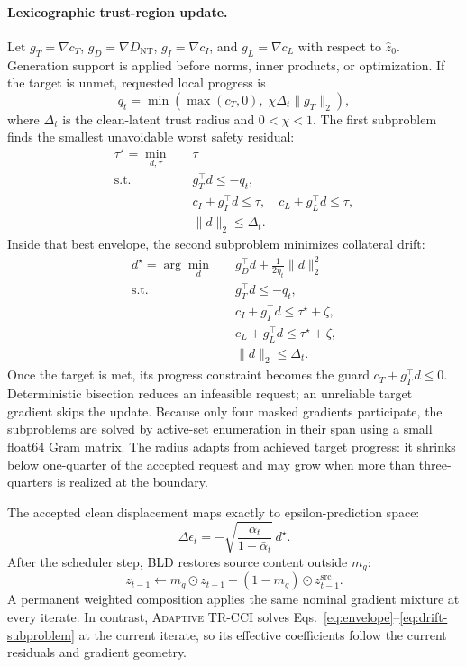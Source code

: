 \documentclass[10pt,twocolumn]{article}
\newcommand{\method}{\textsc{Adaptive TR-CCI}}
\newcommand{\bld}{\textsc{BLD}}
\begin{document}
\paragraph{Lexicographic trust-region update.}
Let $g_T=\nabla c_T$, $g_D=\nabla D_{\mathrm{NT}}$,
$g_I=\nabla c_I$, and $g_L=\nabla c_L$ with respect to $\hat z_0$. Generation
support is applied before norms, inner products, or optimization. If the target
is unmet, requested local progress is
\begin{equation}
 q_t=\min\!\left(\max(c_T,0),\;\chi\Delta_t\lVert g_T\rVert_2\right),
 \label{eq:requested-progress}
\end{equation}
where $\Delta_t$ is the clean-latent trust radius and $0<\chi<1$. The first
subproblem finds the smallest unavoidable worst safety residual:
\begin{align}
 \tau^\star=\min_{d,\tau}\quad&\tau\\
 \text{s.t.}\quad
 &g_T^\top d\leq-q_t,\nonumber\\
 &c_I+g_I^\top d\leq\tau,\quad
  c_L+g_L^\top d\leq\tau,\nonumber\\
 &\lVert d\rVert_2\leq\Delta_t.
 \label{eq:envelope}
\end{align}
Inside that best envelope, the second subproblem minimizes collateral drift:
\begin{align}
 d^\star=\arg\min_d\quad
 &g_D^\top d+\frac{1}{2\eta_t}\lVert d\rVert_2^2\\
 \text{s.t.}\quad
 &g_T^\top d\leq-q_t,\nonumber\\
 &c_I+g_I^\top d\leq\tau^\star+\zeta,\nonumber\\
 &c_L+g_L^\top d\leq\tau^\star+\zeta,\nonumber\\
 &\lVert d\rVert_2\leq\Delta_t.
 \label{eq:drift-subproblem}
\end{align}
Once the target is met, its progress constraint becomes the guard
$c_T+g_T^\top d\leq0$. Deterministic bisection reduces an infeasible request;
an unreliable target gradient skips the update. Because only four masked
gradients participate, the subproblems are solved by active-set enumeration in
their span using a small float64 Gram matrix. The radius adapts from achieved
target progress: it shrinks below one-quarter of the accepted request and may
grow when more than three-quarters is realized at the boundary.

The accepted clean displacement maps exactly to epsilon-prediction space:
\begin{equation}
 \Delta\epsilon_t=-\sqrt{\frac{\bar\alpha_t}{1-\bar\alpha_t}}\,d^\star.
 \label{eq:epsilon-map}
\end{equation}
After the scheduler step, \bld{} restores source content outside $m_g$:
\begin{equation}
 z_{t-1}\leftarrow m_g\odot z_{t-1}
 +(1-m_g)\odot z^{\mathrm{src}}_{t-1}.
 \label{eq:bld}
\end{equation}
A permanent weighted composition applies the same nominal gradient mixture at
every iterate. In contrast, \method{} solves
Eqs.~\eqref{eq:envelope}--\eqref{eq:drift-subproblem} at the current iterate,
so its effective coefficients follow the current residuals and gradient
geometry.
\end{document}
